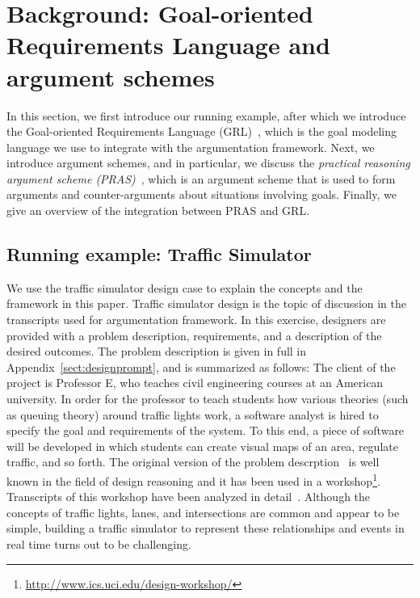 \section{Background: Goal-oriented Requirements Language and argument schemes}
\label{sect:background}

In this section, we first introduce our running example, after which we introduce the Goal-oriented Requirements Language (GRL)~\cite{Amyot:2010:EGM:1841349.1841356}, which is the goal modeling language we use to integrate with the argumentation framework. Next, we introduce argument schemes, and in particular, we discuss the \emph{practical reasoning argument scheme (PRAS)}~\cite{atkinson2007}, which is an argument scheme that is used to form arguments and counter-arguments about situations involving goals. Finally, we give an overview of the integration between PRAS and GRL.  %

\subsection{Running example: Traffic Simulator}
\label{sect:goals:runningexample}

We use the traffic simulator design case to explain the concepts and the framework in this paper. Traffic simulator design is the topic of discussion in the transcripts used for argumentation framework.   
In this exercise, designers are provided with a problem description, requirements, and a description of the desired outcomes. The problem description is given in full in Appendix~\ref{sect:designprompt}, and is summarized as follows: The client of the project is Professor E, who teaches civil engineering courses at an American university. In order for the professor to teach students how various theories (such as queuing theory) around traffic lights work, a software analyst is hired to specify the goal and requirements of the system. %
To this end, a piece of software will be developed in which students can create visual maps of an area, regulate traffic, and so forth. The original version of the problem descrption~\cite{UCIworkshop} is well known in the field of design reasoning and it has been used in a workshop\footnote{\url{http://www.ics.uci.edu/design-workshop/}}. Transcripts of this workshop have been analyzed in detail~\cite{Petre:2013:SDA:2535028}. Although the concepts of traffic lights, lanes, and intersections are common and appear to be simple, building a traffic simulator to represent these relationships and events in real time turns out to be challenging.

